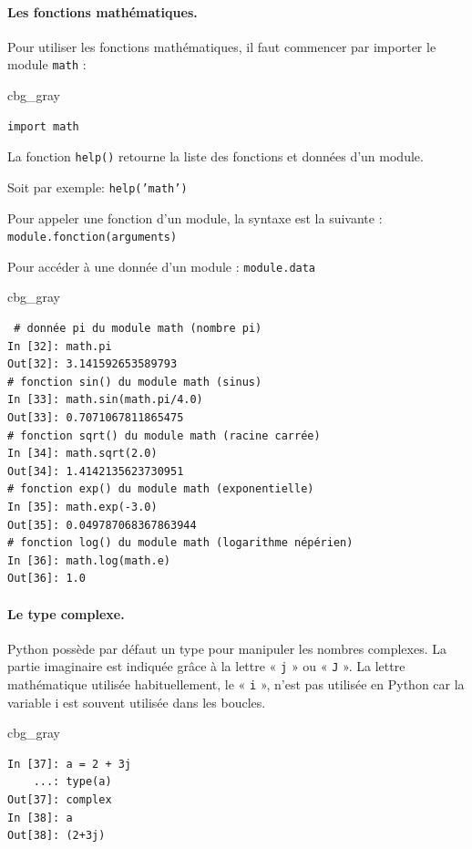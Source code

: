 \documentclass[%
oneside,                 %
final,                   %
10pt]{article}
\newenvironment{_cod_tight}[1]{
   \def\FrameCommand{\colorbox{#1}}
   \FrameRule0.6pt\MakeFramed {\FrameRestore}\vskip3mm}
   {\vskip0mm\endMakeFramed}
\newenvironment{cod}[1]{
\bgroup\rmfamily
\fboxsep=0mm\relax
\begin{_cod_tight}{#1}
\list{}{\parsep=-2mm\parskip=0mm\topsep=0pt\leftmargin=2mm
\rightmargin=2\leftmargin\leftmargin=4pt\relax}
\item\relax}
{\endlist\end{_cod_tight}\egroup}
\begin{document}
\paragraph{Les fonctions mathématiques.}
Pour utiliser les fonctions mathématiques, il faut commencer par importer le module \texttt{math} :

\begin{cod}{cbg_gray}\begin{verbatim}
import math
\end{verbatim}
\end{cod}
\noindent
La fonction \texttt{help()} retourne la liste des fonctions et données d'un module.

Soit par exemple: \texttt{help('math')}

Pour appeler une fonction d'un module, la syntaxe est la suivante : \texttt{module.fonction(arguments)}

Pour accéder à une donnée d'un module : \texttt{module.data}

\begin{cod}{cbg_gray}\begin{verbatim}
 # donnée pi du module math (nombre pi)
In [32]: math.pi
Out[32]: 3.141592653589793
# fonction sin() du module math (sinus)
In [33]: math.sin(math.pi/4.0)
Out[33]: 0.7071067811865475
# fonction sqrt() du module math (racine carrée)
In [34]: math.sqrt(2.0)
Out[34]: 1.4142135623730951
# fonction exp() du module math (exponentielle)
In [35]: math.exp(-3.0)
Out[35]: 0.049787068367863944
# fonction log() du module math (logarithme népérien)
In [36]: math.log(math.e)
Out[36]: 1.0
\end{verbatim}
\end{cod}
\noindent

\paragraph{Le type complexe.}
Python possède par défaut un type pour manipuler les nombres complexes. La partie imaginaire est indiquée grâce à la lettre « \texttt{j} » ou « \texttt{J} ». La lettre mathématique utilisée habituellement, le « \texttt{i} », n’est pas utilisée en Python car la variable i est souvent utilisée dans les boucles.

\begin{cod}{cbg_gray}\begin{verbatim}
In [37]: a = 2 + 3j
    ...: type(a)
Out[37]: complex
In [38]: a
Out[38]: (2+3j)
\end{verbatim}
\end{cod}
\noindent
\end{document}

